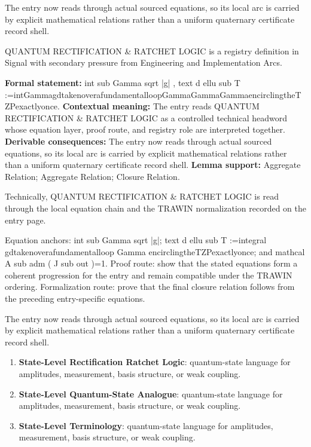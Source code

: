 The entry now reads through actual sourced equations, so its local arc is carried by explicit mathematical relations rather than a uniform quaternary certificate record shell.
\clearpage


\begingroup\small
{}
QUANTUM RECTIFICATION \& RATCHET LOGIC is a registry definition in Signal with secondary pressure from Engineering and Implementation Arcs.

\begingroup\footnotesize\setlength{\emergencystretch}{3em}\sloppy
\textbf{Formal statement:} int sub Gamma sqrt |g| , text d ellu sub T :=intGammagdtakenoverafundamentalloopGammaGammaGammaencirclingtheTZPexactlyonce. \textbf{Contextual meaning:} The entry reads QUANTUM RECTIFICATION \& RATCHET LOGIC as a controlled technical headword whose equation layer, proof route, and registry role are interpreted together. \textbf{Derivable consequences:} The entry now reads through actual sourced equations, so its local arc is carried by explicit mathematical relations rather than a uniform quaternary certificate record shell. \textbf{Lemma support:} Aggregate Relation; Aggregate Relation; Closure Relation.\par
\endgroup

Technically, QUANTUM RECTIFICATION \& RATCHET LOGIC is read through the local equation chain and the TRAWIN normalization recorded on the entry page.

Equation anchors: int sub Gamma sqrt |g|; text d ellu sub T :=integral gdtakenoverafundamentalloop Gamma encirclingtheTZPexactlyonce; and mathcal A sub adm ( J sub out )=1. Proof route: show that the stated equations form a coherent progression for the entry and remain compatible under the TRAWIN ordering. Formalization route: prove that the final closure relation follows from the preceding entry-specific equations.

The entry now reads through actual sourced equations, so its local arc is carried by explicit mathematical relations rather than a uniform quaternary certificate record shell.
\endgroup

\begin{enumerate}[leftmargin=1.6em,itemsep=6pt,topsep=4pt]
\item \textbf{State-Level Rectification Ratchet Logic}: quantum-state language for amplitudes, measurement, basis structure, or weak coupling.
\item \textbf{State-Level Quantum-State Analogue}: quantum-state language for amplitudes, measurement, basis structure, or weak coupling.
\item \textbf{State-Level Terminology}: quantum-state language for amplitudes, measurement, basis structure, or weak coupling.
\end{enumerate}

